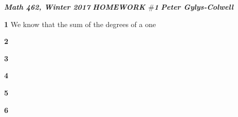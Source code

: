 \documentclass[12pt]{article}
\newenvironment{ques}{\vspace{2 ex}}{\vspace{2 ex}}
\theoremstyle{definition}
\begin{document}
\noindent \textit{\textbf{Math 462, Winter 2017}} \hspace{1.3cm}
\textit{\textbf{HOMEWORK $\#$1}} \hspace{1.3cm} \textit{\textbf{Peter
Gylys-Colwell}} 

\vspace{1cm}
\begin{ques}
	\textbf{1}
		We know that the sum of the degrees of a one 
\end{ques}

\begin{ques}
	\textbf{2}
\end{ques}

\begin{ques}
	\textbf{3}
\end{ques}

\begin{ques}
	\textbf{4}
\end{ques}

\begin{ques}
	\textbf{5}
\end{ques}

\begin{ques}
	\textbf{6}
\end{ques}
\end{document}
